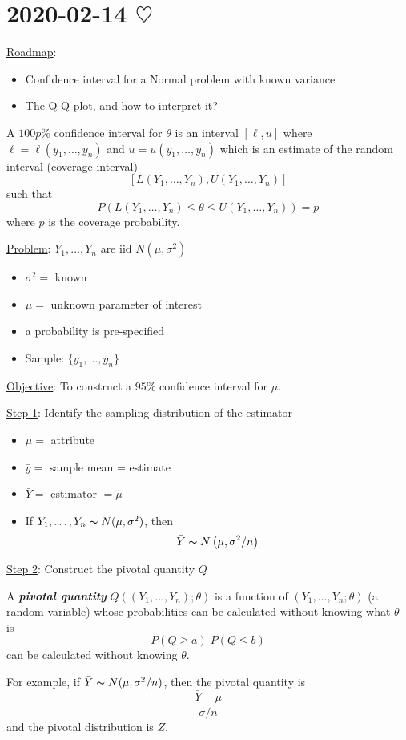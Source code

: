 \section{2020-02-14 \texorpdfstring{$\heartsuit$}{[Valentine's Day!]}}

\underline{Roadmap}:
\begin{itemize}
    \item Confidence interval for a Normal problem with known variance
    \item The Q-Q-plot, and how to interpret it?
\end{itemize}
\begin{defbox}
    \begin{definition}
        A $ 100p\% $ confidence interval for $ \theta $ is an interval $
            [\ell,u] $ where $ \ell=\ell(y_1,\ldots ,y_n) $ and $ u=u(y_1,\ldots
            ,y_n) $ which is an estimate of the random interval (coverage interval)
        \[ \left[ L(Y_1,\ldots ,Y_n),U(Y_1,\ldots ,Y_n) \right] \] such that
        \[ P\left( L(Y_1,\ldots ,Y_n)\leqslant \theta\leqslant U(Y_1,\ldots
            ,Y_n) \right)=p \] where $ p $ is the coverage probability.
    \end{definition}
\end{defbox}
\underline{Problem}:  $ Y_1,\ldots ,Y_n $ are iid $ N(\mu,\sigma^2) $
\begin{itemize}
    \item $ \sigma^2= $ known
    \item $ \mu= $ unknown parameter of interest
    \item a probability is pre-specified
    \item Sample: $ \{y_1,\ldots ,y_n\} $
\end{itemize}
\underline{Objective}: To construct a $ 95\% $ confidence interval for $ \mu $.

\underline{Step 1}: Identify the sampling distribution of the estimator
\begin{itemize}
    \item $ \mu= $ attribute
    \item $ \bar{y}= $ sample mean = estimate
    \item $ \bar{Y}= $ estimator $ = \tilde{\mu} $
    \item If $ Y_1,\ldots ,Y_n \thicksim N(\mu,\sigma^2) $, then
          \[ \bar{Y} \thicksim N\left( \mu,\sigma^2/n \right) \]
\end{itemize}
\underline{Step 2}: Construct the pivotal quantity $ Q $
\begin{defbox}
    \begin{definition}
        A \textbf{\emph{pivotal quantity}} $ Q((Y_1,\ldots ,Y_n);\theta) $ is a
        function of $ \left( Y_1,\ldots ,Y_n;\theta \right) $ (a random
        variable) whose probabilities can be calculated without knowing what $
            \theta $ is
        \[ P(Q\geqslant a)\; P(Q\leqslant b) \] can be calculated without
        knowing $ \theta $.
    \end{definition}
\end{defbox}
For example, if $ \bar{Y} \thicksim N(\mu,\sigma^2/n) $, then the pivotal
quantity is
\[ \frac{\bar{Y}-\mu}{\sigma/n} \] and the pivotal distribution is $ Z $.

